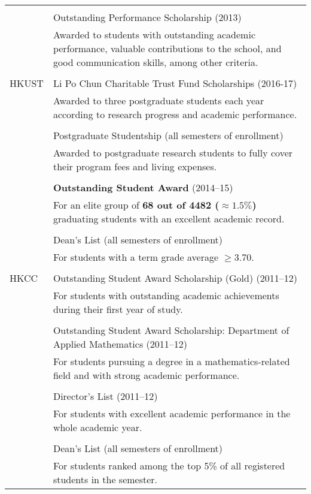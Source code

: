 \documentclass[10pt, oneside]{article}
\def \b {\textbf}
\begin{document}
\begin{tabularx}{\linewidth}{p{2.2cm}|p{16cm}}
	\\\\
	& Outstanding Performance Scholarship (2013) \\
	& \small{Awarded to students with outstanding academic performance, valuable contributions to the school, and good communication skills, among other criteria.}
	\\\\
	HKUST 
	& Li Po Chun Charitable Trust Fund Scholarships (2016-17)\\
	&	\small{Awarded to three postgraduate students each year according to research progress and academic performance.}
\\\\
	& Postgraduate Studentship (all semesters of enrollment)\\
	& \small{Awarded to postgraduate research students to fully cover their program fees and living expenses.}
	\\\\
	& \textbf{Outstanding Student Award} (2014--15)\\
	& \small{For an elite group of \b{68 out of 4482 ($\approx 1.5\%$)} graduating students  with an excellent academic record.}
	\\\\
	& Dean's List (all semesters of enrollment)\\
	&\small{For students with a term grade average $\ge3.70$.}
	\\\\
	HKCC & Outstanding Student Award Scholarship (Gold) (2011--12) \\
	&\small{For students with outstanding academic achievements during their first year of study.}
	\\\\
	& Outstanding Student Award Scholarship: Department of Applied Mathematics (2011--12) \\
	&\small{For students pursuing a degree in a mathematics-related field and with strong academic performance.}
	\\\\

	&  Director's List (2011--12)\\
	&\small{For students with excellent academic performance in the whole academic year.}
	\\\\
	& Dean's List (all semesters of enrollment) \\
	&\small{For students ranked among the top 5\% of all registered students in the semester.}
\end{tabularx}
\end{document}
